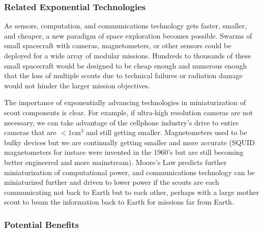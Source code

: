 \documentclass[letter,11pt]{article}
\begin{document}
\subsubsection{Related Exponential Technologies}

As sensors, computation, and communications technology gets faster, smaller,
and cheaper, a new paradigm of space exploration becomes possible. Swarms of
small spacecraft with cameras, magnetometers, or other sensors could be
deployed for a wide array of modular missions. Hundreds to thousands of these
small spacecraft would be designed to be cheap enough and numerous enough that
the loss of multiple scouts due to technical failures or radiation damage
would not hinder the larger mission objectives. 

The importance of exponentially advancing technologies in miniaturization of
scout components is clear. For example, if ultra-high resolution cameras are
not necessary, we can take advantage of the cellphone industry's drive to
entire cameras that are $< 1 \mbox{cm}^3$ and still getting smaller.
Magnetometers used to be bulky devices but we are continually getting smaller
and more accurate (SQUID magnetometers for instace were invented in the 1960's
but are still becoming better engineered and more mainstream). Moore's Law
predicts further miniaturization of computational power, and communications
technology can be miniaturized further and driven to lower power if the scouts
are each communicating not back to Earth but to each other, perhaps with a
large mother scout to beam the information back to Earth for missions far from
Earth. 

\subsubsection{Potential Benefits}
\end{document}
